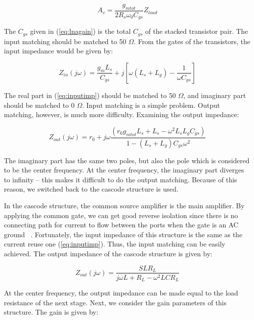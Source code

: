 \begin{equation} 
  	A_{v} = \frac{g_{mtot}}{2R_s \omega_0 C_{gs}}Z_{load}
	\label{eq:lnagain}
\end{equation}

The $C_{gs}$ given in (\ref{eq:lnagain}) is the total $C_{gs}$ of the stacked transistor pair.  The input matching should be matched to 50 $\Omega$. From the gates of the transistors, the input impedance would be given by:

\begin{equation} 
  	Z_{in}(j\omega)=\frac{g_mL_s}{C_{gs}} + j[\omega (L_s+L_g) - \frac{1}{\omega C_{gs}}]
	\label{eq:inputimp}
\end{equation}

The real part in (\ref{eq:inputimp}) should be matched to 50 $\Omega$, and imaginary part should be matched to 0 $\Omega$. Input matching is a simple problem. Output matching, however, is much more difficulty. Examining the output impedance:

\begin{equation} 
  	Z_{out}(j\omega) = r_0 + j\omega\frac{(r_0g_{mtot}L_s+L_s-\omega^2L_sL_gC_{gs})}{1-(L_s+L_g)C_{gs}\omega^2}
\end{equation}

The imaginary part has the same two poles, but also the pole which is considered to be the center frequency. At the center frequency, the imaginary part diverges to infinity -- this makes it difficult to do the output matching. Because of this reason, we switched back to the cascode structure is used.

In the cascode structure, the common source amplifier is the main amplifier. By applying the common gate, we can get good reverse isolation since there is no connecting path for current to flow between the ports when the gate is an AC ground ~\cite{Razavi}. Fortunately, the input impedance of this structure is the same as the current reuse one (\ref{eq:inputimp}). Thus, the input matching can be easily achieved. The output impedance of the cascode structure is given by:

\begin{equation} 
  	Z_{out}(j\omega) = \frac{SLR_L}{j\omega L+R_L-\omega^2LCR_L}
\end{equation}

At the center frequency, the output impedance can be made equal to  the load resistance of the next stage. Next, we consider the gain parameters of this structure. The gain is given by:


